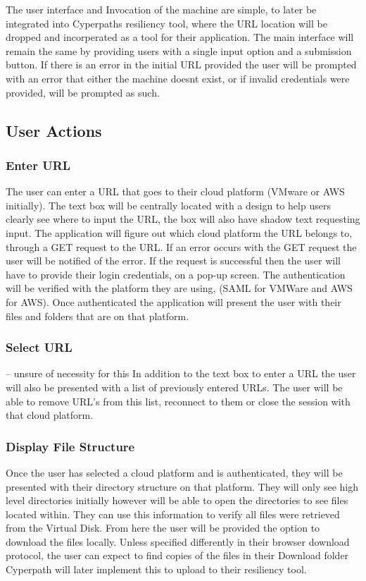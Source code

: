 \documentclass{article}
\begin{document}
        The user interface and Invocation of the machine are simple, to later be integrated into Cyperpaths resiliency tool, where the URL location will be dropped 
        and incorperated as a tool for their application. The main interface will remain the same by providing users with a single input option and a submission button.
        If there is an error in the initial URL provided the user will be prompted with an error that either the machine doesnt exist, or if invalid credentials 
        were provided, will be prompted as such.

        \subsection{User Actions}
            \subsubsection{Enter URL}
            The user can enter a URL that goes to their cloud platform (VMware or AWS initially). The text box will be centrally located with a design to help users clearly
            see where to input the URL, the box will also have shadow text requesting input. The application will figure out which cloud platform the URL belongs to, through a GET 
            request to the URL. If an error occurs with the GET request the user will be notified of the error. If the request is successful then the user will have to
            provide their login credentials, on a pop-up screen. The authentication will be verified with the platform they are using, (SAML for VMWare and AWS for AWS).
            Once authenticated the application will present the user with their files and folders that are on that platform.
            
            \subsubsection{Select URL} -- unsure of necessity for this
            In addition to the text box to enter a URL the user will also be presented with a list of previously entered URLs. The user will be able to remove URL's from this list, reconnect to them
            or close the session with that cloud platform.

            \subsubsection{Display File Structure}
            Once the user has selected a cloud platform and is authenticated, they will be presented with their directory structure on that platform. They will only see high level directories initially
            however will be able to open the directories to see files located within. They can use this information to verify all files were retrieved from the Virtual Disk. From here the user will be 
            provided the option to download the files locally. Unless specified differently in their browser download protocol, the user can expect to find copies of the files in their Download folder
            Cyperpath will later implement this to upload to their resiliency tool.
\end{document}
